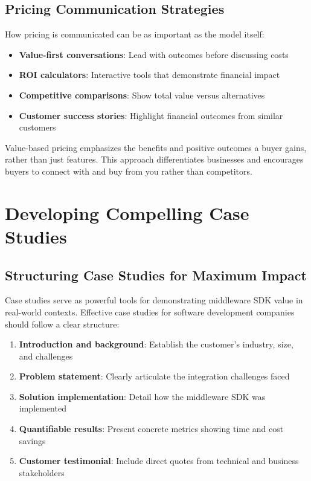 \documentclass[11pt,a4paper]{article}
\begin{document}
\subsection{Pricing Communication Strategies}

How pricing is communicated can be as important as the model itself:

\begin{itemize}
    \item \textbf{Value-first conversations}: Lead with outcomes before discussing costs
    \item \textbf{ROI calculators}: Interactive tools that demonstrate financial impact
    \item \textbf{Competitive comparisons}: Show total value versus alternatives
    \item \textbf{Customer success stories}: Highlight financial outcomes from similar customers
\end{itemize}

Value-based pricing emphasizes the benefits and positive outcomes a buyer gains, rather than just features. This approach differentiates businesses and encourages buyers to connect with and buy from you rather than competitors.

\section{Developing Compelling Case Studies}

\subsection{Structuring Case Studies for Maximum Impact}

Case studies serve as powerful tools for demonstrating middleware SDK value in real-world contexts. Effective case studies for software development companies should follow a clear structure:

\begin{enumerate}
    \item \textbf{Introduction and background}: Establish the customer's industry, size, and challenges
    \item \textbf{Problem statement}: Clearly articulate the integration challenges faced
    \item \textbf{Solution implementation}: Detail how the middleware SDK was implemented
    \item \textbf{Quantifiable results}: Present concrete metrics showing time and cost savings
    \item \textbf{Customer testimonial}: Include direct quotes from technical and business stakeholders
\end{enumerate}
\end{document}
